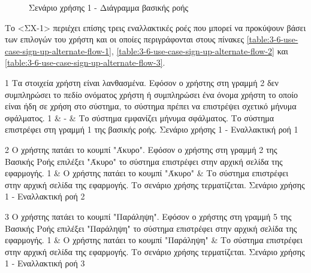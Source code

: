 \begin{figure}[H]
    \centering
    
    \caption{Σενάριο χρήσης 1 - Διάγραμμα βασικής ροής}
    \label{figure:3-6-use-case-sign-up-base-flow-sequence-diagram}
\end{figure}


Το <ΣΧ-1> περιέχει επίσης τρεις εναλλακτικές ροές που μπορεί να προκύψουν βάσει των επιλογών του χρήστη και οι οποίες περιγράφονται στους πίνακες \ref{table:3-6-use-case-sign-up-alternate-flow-1}, \ref{table:3-6-use-case-sign-up-alternate-flow-2} και \ref{table:3-6-use-case-sign-up-alternate-flow-3}.

\useCaseAlternateFlowTable
{1}
{Τα στοιχεία χρήστη είναι λανθασμένα.}
{Εφόσον ο χρήστης στη γραμμή 2 δεν συμπληρώσει το πεδίο ονόματος χρήστη ή συμπληρώσει ένα όνομα χρήστη το οποίο είναι ήδη σε χρήση στο σύστημα, το σύστημα πρέπει να επιστρέψει σχετικό μήνυμα σφάλματος.}
{
    1 & - & Το σύστημα εμφανίζει μήνυμα σφάλματος.
}
{Το σύστημα επιστρέφει στη γραμμή 1 της βασικής ροής.}
{Σενάριο χρήσης 1 - Εναλλακτική ροή 1}
{\label{table:3-6-use-case-sign-up-alternate-flow-1}}

\useCaseAlternateFlowTable
{2}
{Ο χρήστης πατάει το κουμπί "Άκυρο".}
{Εφόσον ο χρήστης στη γραμμή 2 της Βασικής Ροής επιλέξει "Άκυρο" το σύστημα επιστρέφει στην αρχική σελίδα της εφαρμογής.}
{
    1 & Ο χρήστης πατάει το κουμπί "Άκυρο" & Το σύστημα επιστρέφει στην αρχική σελίδα της εφαρμογής.
}
{Το σενάριο χρήσης τερματίζεται.}
{Σενάριο χρήσης 1 - Εναλλακτική ροή 2}
{\label{table:3-6-use-case-sign-up-alternate-flow-2}}

\useCaseAlternateFlowTable
{3}
{Ο χρήστης πατάει το κουμπί "Παράληψη".}
{Εφόσον ο χρήστης στη γραμμή 5 της Βασικής Ροής επιλέξει "Παράληψη" το σύστημα επιστρέφει στην αρχική σελίδα της εφαρμογής.}
{
    1 & Ο χρήστης πατάει το κουμπί "Παράληψη" & Το σύστημα επιστρέφει στην αρχική σελίδα της εφαρμογής.
}
{Το σενάριο χρήσης τερματίζεται.}
{Σενάριο χρήσης 1 - Εναλλακτική ροή 3}
{\label{table:3-6-use-case-sign-up-alternate-flow-3}}
